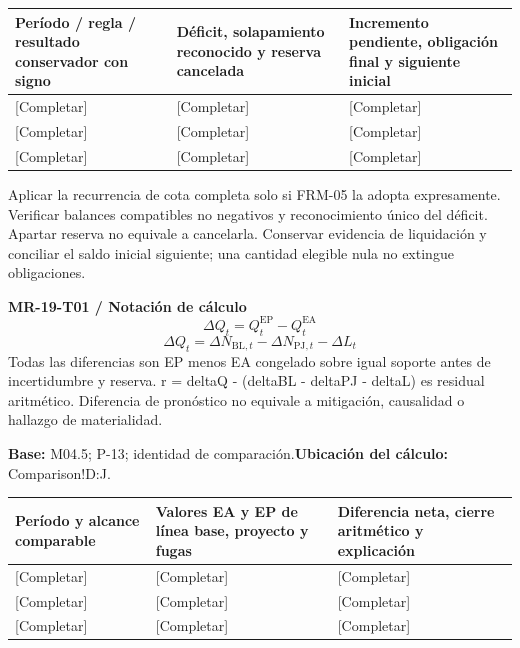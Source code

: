 {\sffamily\fontsize{8.6}{10.7}\selectfont\begin{longtable}{@{}P{48mm}P{61mm}P{53mm}@{}}
\toprule
\textbf{Período / regla / resultado conservador con signo} & \textbf{Déficit, solapamiento reconocido y reserva cancelada} & \textbf{Incremento pendiente, obligación final y siguiente inicial}\\\midrule\endhead
\rule{0pt}{8mm}[Completar] & [Completar] & [Completar]\\\hline
\rule{0pt}{8mm}[Completar] & [Completar] & [Completar]\\\hline
\rule{0pt}{8mm}[Completar] & [Completar] & [Completar]\\\hline
\end{longtable}}
Aplicar la recurrencia de cota completa solo si FRM-05 la adopta expresamente. Verificar balances compatibles no negativos y reconocimiento único del déficit. Apartar reserva no equivale a cancelarla. Conservar evidencia de liquidación y conciliar el saldo inicial siguiente; una cantidad elegible nula no extingue obligaciones.\par
{}
\par\begingroup\sffamily\fontsize{8.4}{10.5}\selectfont\color{NEBGreen}
\textbf{MR-19-T01 / Notación de cálculo}\
{\fontsize{10}{12}\selectfont\[\Delta Q_t=Q_t^{\mathrm{EP}}-Q_t^{\mathrm{EA}}\]}
{\fontsize{10}{12}\selectfont\[\Delta Q_t=\Delta N_{\mathrm{BL},t}-\Delta N_{\mathrm{PJ},t}-\Delta L_t\]}
Todas las diferencias son EP menos EA congelado sobre igual soporte antes de incertidumbre y reserva. r = deltaQ - (deltaBL - deltaPJ - deltaL) es residual aritmético. Diferencia de pronóstico no equivale a mitigación, causalidad o hallazgo de materialidad.\par
\textbf{Base:} M04.5; P-13; identidad de comparación.\quad\textbf{Ubicación del cálculo:} Comparison!D:J.\par\endgroup
{\sffamily\fontsize{8.6}{10.7}\selectfont\begin{longtable}{@{}P{48mm}P{61mm}P{53mm}@{}}
\toprule
\textbf{Período y alcance comparable} & \textbf{Valores EA y EP de línea base, proyecto y fugas} & \textbf{Diferencia neta, cierre aritmético y explicación}\\\midrule\endhead
\rule{0pt}{8mm}[Completar] & [Completar] & [Completar]\\\hline
\rule{0pt}{8mm}[Completar] & [Completar] & [Completar]\\\hline
\rule{0pt}{8mm}[Completar] & [Completar] & [Completar]\\\hline
\end{longtable}}
